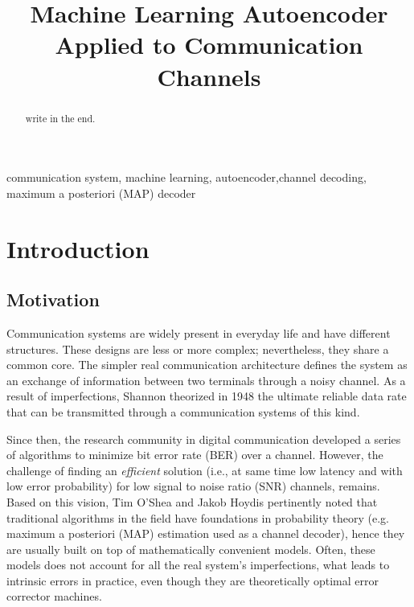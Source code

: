 \documentclass[conference]{IEEEtran}
\begin{document}
\title{Machine Learning Autoencoder Applied to Communication Channels}


\author{
}


\maketitle

\begin{abstract}

write in the end.

\end{abstract}

\begin{IEEEkeywords}
communication system, machine learning, autoencoder,channel decoding, maximum a posteriori (MAP) decoder 
\end{IEEEkeywords}

\section{Introduction}
\subsection{Motivation}
Communication systems are widely present in  everyday life and have different structures. These designs are less or more complex; nevertheless, they share a common core. The simpler real communication architecture defines the system as an exchange of information between two terminals through a noisy channel. As a result of imperfections, Shannon theorized \cite{b1} in 1948 the ultimate reliable data rate that can be transmitted through a communication systems of this kind. 

Since then, the research community in digital communication developed a series of algorithms to minimize bit error rate (BER) over a channel. However, the challenge of finding an \textit{efficient} solution  (i.e., at same time low latency and with low error probability) for low signal to noise ratio (SNR) channels, remains. Based on this vision, Tim O'Shea and Jakob Hoydis \cite{b2} pertinently noted that traditional algorithms in the field have foundations in probability theory (e.g. maximum a posteriori (MAP) estimation used as a channel decoder), hence they are usually built on top of mathematically convenient models. Often, these models does not account for all the real system's imperfections, what leads to intrinsic errors in practice, even though they are theoretically optimal error corrector machines. 
\end{document}
